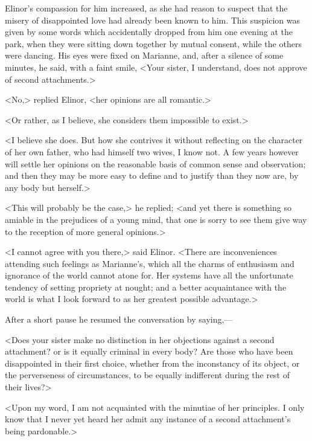 Elinor's compassion for him increased, as she had reason to suspect that the misery of disappointed love had already been known to him. This suspicion was given by some words which accidentally dropped from him one evening at the park, when they were sitting down together by mutual consent, while the others were dancing. His eyes were fixed on Marianne, and, after a silence of some minutes, he said, with a faint smile, <Your sister, I understand, does not approve of second attachments.>

<No,> replied Elinor, <her opinions are all romantic.>

<Or rather, as I believe, she considers them impossible to exist.>

<I believe she does. But how she contrives it without reflecting on the character of her own father, who had himself two wives, I know not. A few years however will settle her opinions on the reasonable basis of common sense and observation; and then they may be more easy to define and to justify than they now are, by any body but herself.>

<This will probably be the case,> he replied; <and yet there is something so amiable in the prejudices of a young mind, that one is sorry to see them give way to the reception of more general opinions.>

<I cannot agree with you there,> said Elinor. <There are inconveniences attending such feelings as Marianne's, which all the charms of enthusiasm and ignorance of the world cannot atone for. Her systems have all the unfortunate tendency of setting propriety at nought; and a better acquaintance with the world is what I look forward to as her greatest possible advantage.>

After a short pause he resumed the conversation by saying,—

<Does your sister make no distinction in her objections against a second attachment? or is it equally criminal in every body? Are those who have been disappointed in their first choice, whether from the inconstancy of its object, or the perverseness of circumstances, to be equally indifferent during the rest of their lives?>

<Upon my word, I am not acquainted with the minutiae of her principles. I only know that I never yet heard her admit any instance of a second attachment's being pardonable.>

